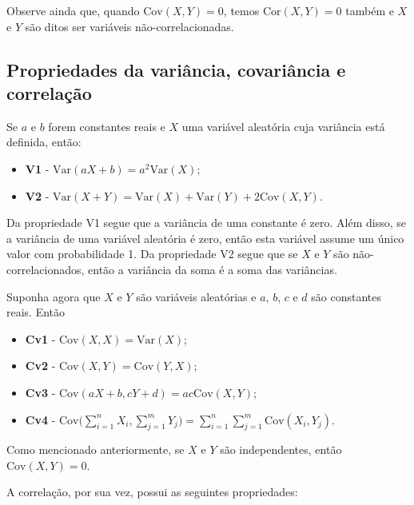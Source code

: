 \documentclass[
]{book}
\theoremstyle{definition}
\theoremstyle{definition}
\theoremstyle{definition}
\theoremstyle{remark}
\begin{document}
Observe ainda que, quando \(\mbox{Cov}(X,Y)=0\), temos \(\mbox{Cor}(X,Y)=0\) também e \(X\) e \(Y\) são ditos ser variáveis não-correlacionadas.

\hypertarget{propriedades-da-variuxe2ncia-covariuxe2ncia-e-correlauxe7uxe3o}{%
\subsection{Propriedades da variância, covariância e correlação}\label{propriedades-da-variuxe2ncia-covariuxe2ncia-e-correlauxe7uxe3o}}

Se \(a\) e \(b\) forem constantes reais e \(X\) uma variável aleatória cuja variância está definida, então:

\begin{itemize}
\item
  \textbf{V1} - \(\mbox{Var}(aX+b)=a^2\mbox{Var}(X);\)
\item
  \textbf{V2} - \(\mbox{Var}(X+Y) =\mbox{Var}(X) + \mbox{Var}(Y)+ 2 \mbox{Cov}(X, Y).\)
\end{itemize}

Da propriedade V1 segue que a variância de uma constante é zero. Além disso, se a variância de uma variável aleatória é zero, então esta variável assume um único valor com probabilidade 1. Da propriedade V2 segue que se \(X\) e \(Y\) são não-correlacionados, então a variância da soma é a soma das variâncias.

Suponha agora que \(X\) e \(Y\) são variáveis aleatórias e \(a\), \(b\), \(c\) e \(d\) são constantes reais. Então

\begin{itemize}
\item
  \textbf{Cv1} - \(\mbox{Cov}(X, X) = \mbox{Var}(X)\);
\item
  \textbf{Cv2} - \(\mbox{Cov}(X, Y) = \mbox{Cov}(Y,X)\);
\item
  \textbf{Cv3} - \(\mbox{Cov}(aX + b, cY + d) = ac\mbox{Cov}(X, Y)\);
\item
  \textbf{Cv4} - \(\displaystyle{\mbox{Cov}\bigg(\sum_{i=1}^n{X_i}, \sum_{j=1}^m{Y_j}\bigg)= \sum_{i=1}^n\sum_{j=1}^m\mbox{Cov}(X_i, Y_j)}\).
\end{itemize}

Como mencionado anteriormente, se \(X\) e \(Y\) são independentes, então \(\mbox{Cov}(X,Y)=0\).

A correlação, por sua vez, possui as seguintes propriedades:
\end{document}
